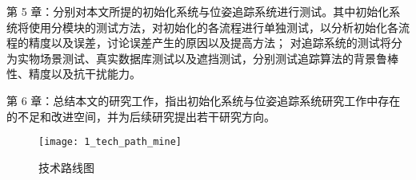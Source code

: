 第 5 章：分别对本文所提的初始化系统与位姿追踪系统进行测试。其中初始化系统将使用分模块的测试方法，对初始化的各流程进行单独测试，以分析初始化各流程的精度以及误差，讨论误差产生的原因以及提高方法；
对追踪系统的测试将分为实物场景测试、真实数据库测试以及遮挡测试，分别测试追踪算法的背景鲁棒性、精度以及抗干扰能力。

第 6 章：总结本文的研究工作，指出初始化系统与位姿追踪系统研究工作中存在的不足和改进空间，并为后续研究提出若干研究方向。

\begin{figure}[!p]
  \centering
\texttt{[image: 1\_tech\_path\_mine]}
  \caption{技术路线图}
  \label{fig:tech_path}
\end{figure}

